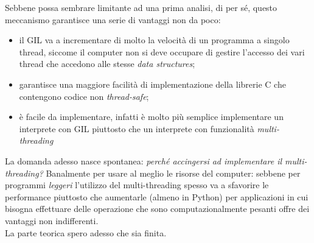 \documentclass{report}
\begin{document}
\noindent Sebbene possa sembrare limitante ad una prima analisi, di per sé, questo meccanismo garantisce una serie di vantaggi non da poco:
\begin{itemize}
	\item il GIL va a incrementare di molto la velocità di un programma a singolo thread, siccome il computer non si deve occupare di gestire l'accesso dei vari thread che accedono alle stesse \emph{data structures};
	\item garantisce una maggiore facilità di implementazione della librerie C che contengono codice non \emph{thread-safe};
	\item è facile da implementare, infatti è molto più semplice implementare un interprete con GIL piuttosto che un interprete con funzionalità \emph{multi-threading}
\end{itemize} 
La domanda adesso nasce spontanea: \emph{perché accingersi ad implementare il multi-threading?} Banalmente per usare al meglio le risorse del computer: sebbene per programmi \emph{leggeri} l'utilizzo del multi-threading spesso va a sfavorire le performance piuttosto che aumentarle (almeno in Python) per applicazioni in cui bisogna effettuare delle operazione che sono computazionalmente pesanti offre dei vantaggi non indifferenti. \\
La parte teorica spero adesso che sia finita.
\end{document}
